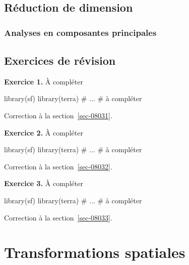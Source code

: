\documentclass[
  letterpaper,
  DIV=11,
  numbers=noendperiod]{scrreprt}
\newenvironment{Shaded}{\begin{snugshade}}{\end{snugshade}}
\newcommand{\CommentTok}[1]{\textcolor[rgb]{0.37,0.37,0.37}{#1}}
\newcommand{\NormalTok}[1]{\textcolor[rgb]{0.00,0.23,0.31}{#1}}
\begin{document}
\section{Réduction de dimension}\label{sec-032}

\subsection{Analyses en composantes principales}\label{sec-0311}

\section{Exercices de révision}\label{sec-037}

\textbf{Exercice 1.} À compléter

\begin{Shaded}
\begin{Highlighting}[]
\NormalTok{library(sf)}
\NormalTok{library(terra)}
\CommentTok{\# ...}
\CommentTok{\# à compléter}
\end{Highlighting}
\end{Shaded}

Correction à la section~\ref{sec-08031}.

\textbf{Exercice 2.} À compléter

\begin{Shaded}
\begin{Highlighting}[]
\NormalTok{library(sf)}
\NormalTok{library(terra)}
\CommentTok{\# ...}
\CommentTok{\# à compléter}
\end{Highlighting}
\end{Shaded}

Correction à la section~\ref{sec-08032}.

\textbf{Exercice 3.} À compléter

\begin{Shaded}
\begin{Highlighting}[]
\NormalTok{library(sf)}
\NormalTok{library(terra)}
\CommentTok{\# ...}
\CommentTok{\# à compléter}
\end{Highlighting}
\end{Shaded}

Correction à la section~\ref{sec-08033}.


\chapter{Transformations spatiales}\label{sec-chap04}
\end{document}
